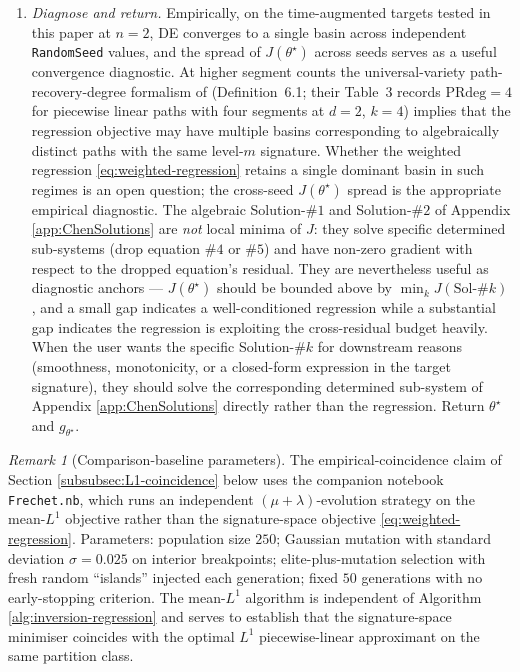 \documentclass[12pt,english]{article}
\newcommand{\nbfile}[1]{\nolinkurl{#1}}
\theoremstyle{remark}
\newtheorem{remark}[theorem]{Remark}
\begin{document}
\begin{algorithm}[H]
\begin{enumerate}
\item \emph{Diagnose and return.} Empirically, on the time-augmented
targets tested in this paper at $n=2$, DE converges to a single basin
across independent \texttt{RandomSeed} values, and the spread of $J(\theta^{\star})$
across seeds serves as a useful convergence diagnostic. At higher
segment counts the universal-variety path-recovery-degree formalism
of \cite{splines} (Definition~6.1; their Table~3 records $\mathrm{PRdeg}=4$
for piecewise linear paths with four segments at $d=2$, $k=4$) implies
that the regression objective may have multiple basins corresponding
to algebraically distinct paths with the same level-$m$ signature.
Whether the weighted regression \eqref{eq:weighted-regression} retains
a single dominant basin in such regimes is an open question; the cross-seed
$J(\theta^{\star})$ spread is the appropriate empirical diagnostic. The algebraic Solution-$\#1$ and Solution-$\#2$ of Appendix
\ref{app:ChenSolutions} are \emph{not} local minima of $J$: they
solve specific determined sub-systems (drop equation $\#4$ or $\#5$)
and have non-zero gradient with respect to the dropped equation's
residual. They are nevertheless useful as diagnostic anchors --- $J(\theta^{\star})$
should be bounded above by $\min_{k}J(\mathrm{Sol}\text{-}\#k)$, and
a small gap indicates a well-conditioned regression while a substantial
gap indicates the regression is exploiting the cross-residual budget
heavily. When the user wants the specific Solution-$\#k$ for downstream
reasons (smoothness, monotonicity, or a closed-form expression in
the target signature), they should solve the corresponding determined
sub-system of Appendix \ref{app:ChenSolutions} directly rather than
the regression. Return $\theta^{\star}$ and $g_{\theta^{\star}}$.
\end{enumerate}
\end{algorithm}

\begin{remark}[Comparison-baseline parameters]
The empirical-coincidence claim of Section \ref{subsubsec:L1-coincidence}
below uses the companion notebook \nbfile{Frechet.nb}, which runs
an independent $(\mu+\lambda)$-evolution strategy on the mean-$L^{1}$
objective rather than the signature-space objective \eqref{eq:weighted-regression}.
Parameters: population size $250$; Gaussian mutation with standard
deviation $\sigma=0.025$ on interior breakpoints; elite-plus-mutation
selection with fresh random ``islands'' injected each generation;
fixed $50$ generations with no early-stopping criterion. The mean-$L^{1}$
algorithm is independent of Algorithm \ref{alg:inversion-regression}
and serves to establish that the signature-space minimiser coincides
with the optimal $L^{1}$ piecewise-linear approximant on the same
partition class.
\end{remark}
\end{document}
